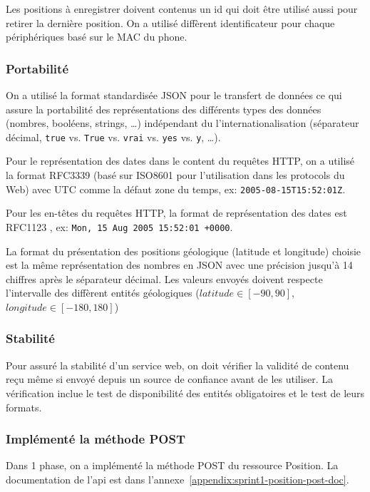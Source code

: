Les positions à enregistrer doivent contenus un id qui doit être utilisé aussi
pour retirer la dernière position.  On a utilisé diffèrent identificateur pour
chaque périphériques basé sur le MAC du phone.

\subsubsection{Portabilité}

On a utilisé la format standardisée JSON pour le transfert de données ce qui
assure la portabilité des représentations des différents types des données
(nombres, booléens, strings, \ldots) indépendant du l'internationalisation
(séparateur décimal, \verb|true| vs. \verb|True| vs. \verb|vrai| vs. \verb|yes|
vs. \verb|y|, \ldots).

Pour le représentation des dates dans le content du requêtes HTTP, on a utilisé
la format RFC3339 \cite{RFC3339} (basé sur ISO8601 \cite{ISO8601} pour
l'utilisation dans les protocols du Web) avec UTC comme la défaut zone du
temps, ex: \verb|2005-08-15T15:52:01Z|.

Pour les en-têtes du requêtes HTTP, la format de représentation des dates est
RFC1123 \cite{RFC1123}, ex: \verb|Mon, 15 Aug 2005 15:52:01 +0000|.

La format du présentation des positions géologique (latitude et longitude)
choisie est la même représentation des nombres en JSON avec une précision
jusqu'à 14 chiffres après le séparateur décimal. Les valeurs envoyés doivent
respecte l'intervalle des diffèrent entités géologiques ($latitude \in [-90,
90]$, $longitude \in [-180, 180]$)

\subsubsection{Stabilité}

Pour assuré la stabilité d'un service web, on doit vérifier la validité de
contenu reçu même si envoyé depuis un source de confiance avant de les
utiliser. La vérification inclue le test de disponibilité des entités
obligatoires et le test de leurs formats.

\subsubsection{Implémenté la méthode POST}

Dans 1\ier{} phase, on a implémenté la méthode POST du ressource Position.
La documentation de l'api est dans l'annexe~\ref{appendix:sprint1-position-post-doc}.

